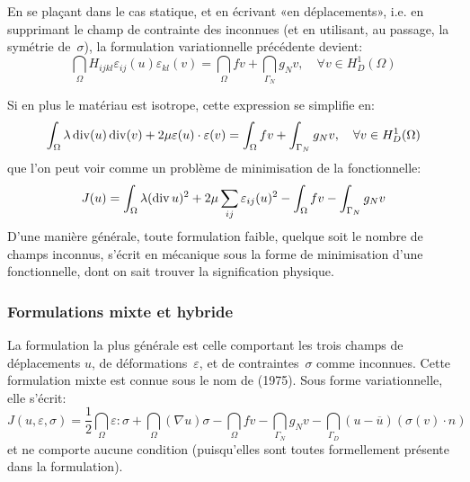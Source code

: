 En se plaçant dans le cas statique, et en écrivant «en déplacements», i.e. en supprimant le champ de contrainte des inconnues (et en utilisant, au passage, la symétrie de~$\sigma$), la formulation variationnelle précédente devient:
\begin{equation}
\dint_\Omega H_{ijkl}\varepsilon_{ij}(u)\varepsilon_{kl}(v) = \dint_\Omega fv +
\dint_{\Gamma_N} g_N v, \quad \forall v\in H^1_D(\Omega)
\end{equation}

\medskip
Si en plus le matériau est isotrope, cette expression se simplifie en:
\begin{equation}\label{Eq-StatLinIso}
\displaystyle\int_\Omega \lambda \operatorname{div}(u)\operatorname{div}(v)+2\mu\varepsilon(u)\cdot\varepsilon(v) = \displaystyle\int_\Omega fv +
\displaystyle\int_{\Gamma_N} g_N v, \quad \forall v\in H^1_D(\Omega)
\end{equation}
que l'on peut voir comme un problème de minimisation de la fonctionnelle:
\begin{equation}
J(u)=
\displaystyle\int_\Omega \lambda (\operatorname{div} u)^2+2\mu\displaystyle\sum_{ij}\varepsilon_{ij}(u)^2 - \displaystyle\int_\Omega fv -
\displaystyle\int_{\Gamma_N} g_N v
\end{equation}
D'une manière générale, toute formulation faible, quelque soit le nombre de champs inconnus, s'écrit en mécanique sous la forme de minimisation d'une fonctionnelle, dont on sait trouver la signification physique.

\medskip
\subsubsection{Formulations mixte et hybride}\label{Sec-MH}
La formulation la plus générale est celle comportant les trois champs de déplacements $u$, de déformations~$\varepsilon$, et de contraintes~$\sigma$ comme inconnues.
Cette formulation mixte est connue sous le nom de  (1975). Sous forme variationnelle, elle s'écrit:
\begin{equation}
J(u,\varepsilon,\sigma) =
\frac12 \dint_\Omega \varepsilon:\sigma
+\dint_\Omega (\nabla u) \sigma
- \dint_\Omega f v
- \dint_{\Gamma_N} g_N v
- \dint_{\Gamma_D} (u-\overline{u}) (\sigma(v)\cdot n)
\end{equation}
et ne comporte aucune condition (puisqu'elles sont toutes formellement présente dans la formulation).

